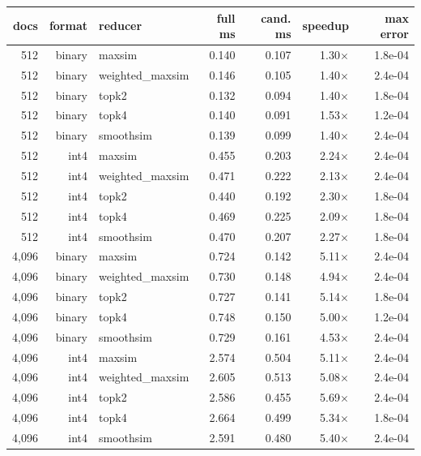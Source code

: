 \begin{tabular}{rrlrrrr}
\toprule
docs & format & reducer & full ms & cand. ms & speedup & max error \\
\midrule
512 & binary & maxsim & 0.140 & 0.107 & 1.30$\times$ & 1.8e-04 \\
512 & binary & weighted\_maxsim & 0.146 & 0.105 & 1.40$\times$ & 2.4e-04 \\
512 & binary & topk2 & 0.132 & 0.094 & 1.40$\times$ & 1.8e-04 \\
512 & binary & topk4 & 0.140 & 0.091 & 1.53$\times$ & 1.2e-04 \\
512 & binary & smoothsim & 0.139 & 0.099 & 1.40$\times$ & 2.4e-04 \\
512 & int4 & maxsim & 0.455 & 0.203 & 2.24$\times$ & 2.4e-04 \\
512 & int4 & weighted\_maxsim & 0.471 & 0.222 & 2.13$\times$ & 2.4e-04 \\
512 & int4 & topk2 & 0.440 & 0.192 & 2.30$\times$ & 1.8e-04 \\
512 & int4 & topk4 & 0.469 & 0.225 & 2.09$\times$ & 1.8e-04 \\
512 & int4 & smoothsim & 0.470 & 0.207 & 2.27$\times$ & 1.8e-04 \\
4,096 & binary & maxsim & 0.724 & 0.142 & 5.11$\times$ & 2.4e-04 \\
4,096 & binary & weighted\_maxsim & 0.730 & 0.148 & 4.94$\times$ & 2.4e-04 \\
4,096 & binary & topk2 & 0.727 & 0.141 & 5.14$\times$ & 1.8e-04 \\
4,096 & binary & topk4 & 0.748 & 0.150 & 5.00$\times$ & 1.2e-04 \\
4,096 & binary & smoothsim & 0.729 & 0.161 & 4.53$\times$ & 2.4e-04 \\
4,096 & int4 & maxsim & 2.574 & 0.504 & 5.11$\times$ & 2.4e-04 \\
4,096 & int4 & weighted\_maxsim & 2.605 & 0.513 & 5.08$\times$ & 2.4e-04 \\
4,096 & int4 & topk2 & 2.586 & 0.455 & 5.69$\times$ & 2.4e-04 \\
4,096 & int4 & topk4 & 2.664 & 0.499 & 5.34$\times$ & 1.8e-04 \\
4,096 & int4 & smoothsim & 2.591 & 0.480 & 5.40$\times$ & 2.4e-04 \\
\bottomrule
\end{tabular}
